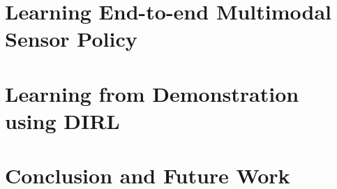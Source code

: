 \documentclass[hidelinks, 12pt]{cmuthesis}
\begin{document}
\chapter{Learning End-to-end Multimodal Sensor Policy} \label{chap:multimodalDRL}


\chapter{Learning from Demonstration using DIRL} \label{chap:dirl}


\chapter{Conclusion and Future Work} \label{chap:conclusion}


%

\backmatter


\renewcommand{\bibsection}{\chapter{\bibname}}
% 

\nocite{*}
\end{document}

